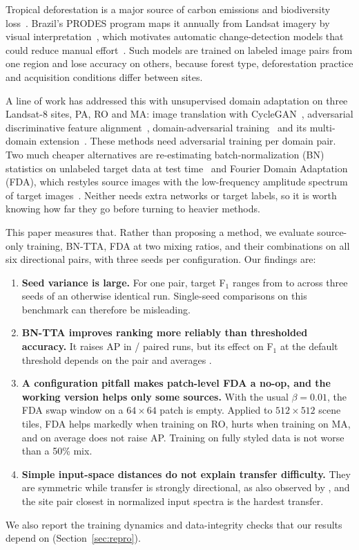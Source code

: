 \documentclass[pdflatex,sn-basic]{sn-jnl}
\newcommand{\BNTTA}{BN-TTA}
\newcommand{\Fone}{F$_1$}
\begin{document}
Tropical deforestation is a major source of carbon emissions and biodiversity loss~\citep{hansen2013high,song2018global}.
Brazil's PRODES program maps it annually from Landsat imagery by visual interpretation~\citep{maurano2019padroes}, which motivates automatic change-detection models that could reduce manual effort~\citep{ortegaadarme2020evaluation,debem2020change}.
Such models are trained on labeled image pairs from one region and lose accuracy on others, because forest type, deforestation practice and acquisition conditions differ between sites.

A line of work has addressed this with unsupervised domain adaptation on three Landsat-8 sites, PA, RO and MA: image translation with CycleGAN~\citep{sotovega2021unsupervised}, adversarial discriminative feature alignment~\citep{noa2021adversarial}, domain-adversarial training~\citep{soto2022domain,sotovega2023weakly} and its multi-domain extension~\citep{demoura2025enhancing}.
These methods need adversarial training per domain pair.
Two much cheaper alternatives are re-estimating batch-normalization (BN) statistics on unlabeled target data at test time~\citep{schneider2020improving,nado2020evaluating} and Fourier Domain Adaptation (FDA), which restyles source images with the low-frequency amplitude spectrum of target images~\citep{yang2020fda}.
Neither needs extra networks or target labels, so it is worth knowing how far they go before turning to heavier methods.

This paper measures that.
Rather than proposing a method, we evaluate source-only training, \BNTTA{}, FDA at two mixing ratios, and their combinations on all six directional pairs, with three seeds per configuration.
Our findings are:
\begin{enumerate}[leftmargin=*, topsep=3pt, itemsep=2pt]
\item \textbf{Seed variance is large.} For one pair, target \Fone{} ranges from \SOWidestLo{} to \SOWidestHi{} across three seeds of an otherwise identical run. Single-seed comparisons on this benchmark can therefore be misleading.
\item \textbf{\BNTTA{} improves ranking more reliably than thresholded accuracy.} It raises AP in \TTAAPAllW{}/\TTAAPAllN{} paired runs, but its effect on \Fone{} at the default threshold depends on the pair and averages \TTAAllD{}.
\item \textbf{A configuration pitfall makes patch-level FDA a no-op, and the working version helps only some sources.} With the usual $\beta=0.01$, the FDA swap window on a $64\times64$ patch is empty. Applied to $512\times512$ scene tiles, FDA helps markedly when training on RO, hurts when training on MA, and on average does not raise AP. Training on fully styled data is not worse than a 50\% mix.
\item \textbf{Simple input-space distances do not explain transfer difficulty.} They are symmetric while transfer is strongly directional, as also observed by \citet{demoura2025enhancing}, and the site pair closest in normalized input spectra is the hardest transfer.
\end{enumerate}
We also report the training dynamics and data-integrity checks that our results depend on (Section~\ref{sec:repro}).
\end{document}
